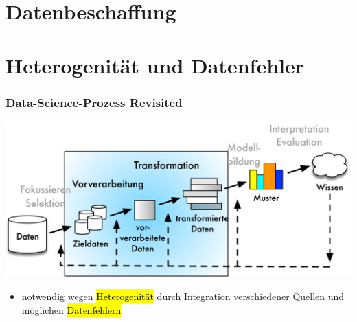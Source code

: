 \section{Datenbeschaffung}



\section{Heterogenität und Datenfehler}



\begin{frame}
    \frametitle{Data-Science-Prozess Revisited}
    
    \begin{center}
    \includegraphics[scale=.6]{fig4/kdd-prozess.pdf}
    \end{center}
    
    \begin{itemize}
    \item notwendig wegen \hl{Heterogenität} durch Integration
      verschiedener Quellen und möglichen \hl{Datenfehlern}
    \end{itemize}
    
    \end{frame}
    
    
